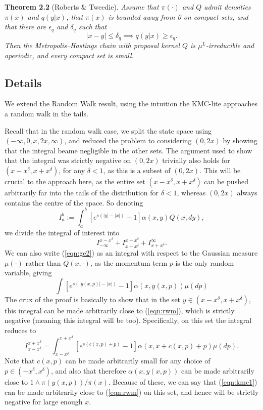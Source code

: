 \documentclass{article}
\begin{document}
\textbf{Theorem 2.2} (Roberts \& Tweedie).  {\itshape Assume that $\pi(\cdot)$ and $Q$ admit densities $\pi(x)$ and $q(y|x)$, that $\pi(x)$ is bounded away from 0 on compact sets, and that there are $\epsilon_q$ and $\delta_q$ such that
\[
|x - y| \leq \delta_q \implies q(y|x) \geq \epsilon_q.
\]
Then the Metropolis--Hastings chain with proposal kernel $Q$ is $\mu^L$-irreducible and aperiodic, and every compact set is small.}

\subsection{Details}

We extend the Random Walk result, using the intuition the KMC-lite approaches a random walk in the tails.

Recall that in the random walk case, we split the state space using $(-\infty,0,x,2x,\infty)$, and reduced the problem to considering $(0,2x)$ by showing that the integral beame negligible in the other sets.  The argument used to show that the integral was strictly negative on $(0,2x)$ trivially
also holds for $(x-x^\delta,x+x^\delta)$, for any $\delta<1$, as this is a subset of $(0,2x)$.  This will be crucial to the approach here, as the entire set $(x - x^\delta,x + x^\delta)$ can be pushed arbitrarily far into the tails of the distribution for $\delta < 1$, whereas $(0,2x)$ always contains the centre of the space.  So denoting
\[
I_a^b := \int_a^b \left[ e^{s(|y| - |x|)} - 1 \right]\alpha(x,y)Q(x,dy),
\]
we divide the integral of interest into
\[
I_{-\infty}^{x - x^\delta} + I_{x - x^\delta}^{x + x^\delta} + I_{x+x^\delta}^\infty.
\]
We can also write (\ref{eqn:ge2}) as an integral with respect to the Gaussian measure $\mu(\cdot)$ rather than $Q(x,\cdot)$, as the momentum term $p$ is the only random variable, giving
\[
\int \left[ e^{s(|y(x,p)| - |x|)} - 1 \right] \alpha(x,y(x,p)) \mu(dp)
\]
The crux of the proof is basically to show that in the set $y \in (x - x^\delta,x+ x^{\delta})$, this integral can be made arbitrarily close to (\ref{eqn:rwm}), which is strictly negative (meaning this integral will be too).  Specifically, on this set the integral reduces to
\begin{equation} \label{eqn:kmc1}
I_{x - x^\delta}^{x + x^\delta} = \int_{x - x^\delta}^{x + x^\delta} \left[ e^{s(c(x,p) + p)} - 1 \right] \alpha(x,x + c(x,p) + p) \mu(dp).
\end{equation}
Note that $c(x,p)$ can be made arbitrarily small for any choice of $p \in (-x^\delta,x^\delta)$, and also that therefore $\alpha(x,y(x,p))$ can be made arbitrarily close to $1 \wedge \pi(y(x,p))/\pi(x)$.  Because of these, we can say that (\ref{eqn:kmc1}) can be made arbitrarily close to (\ref{eqn:rwm}) on this set, and hence will be strictly negative for large enough $x$.
\end{document}

